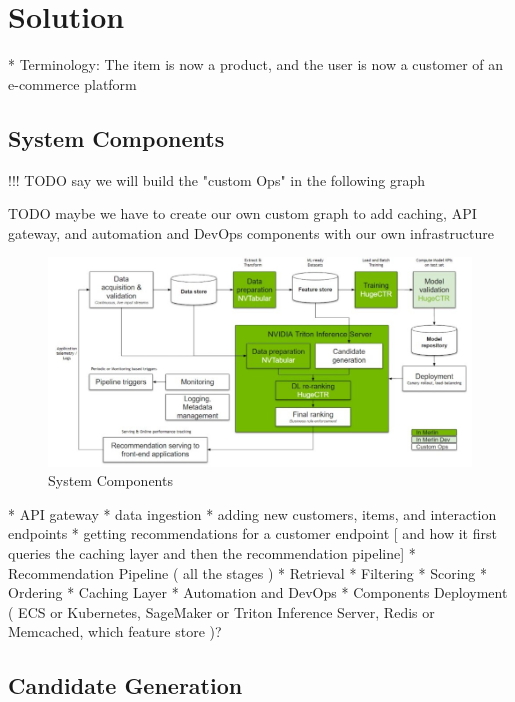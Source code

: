 \chapter{Solution}


* Terminology: The item is now a product, and the user is now a customer of an e-commerce platform

\section{System Components}


!!! TODO say we will build the "custom Ops" in the following graph

TODO maybe we have to create our own custom graph to add caching, API gateway, and automation and DevOps components with our own infrastructure 

\begin{figure}[H]
    \centering
    \includegraphics[width=1\textwidth]{assets/components.jpeg}
    \caption{System Components\cite{NvidiaRecSysBestPractices}}
\end{figure}



* API gateway
    * data ingestion
    * adding new customers, items, and interaction endpoints 
    * getting recommendations for a customer endpoint [ and how it first queries the caching layer and then the recommendation pipeline]
* Recommendation Pipeline ( all the stages )
    * Retrieval
    * Filtering
    * Scoring
    * Ordering
* Caching Layer
* Automation and DevOps
* Components Deployment ( ECS or Kubernetes, SageMaker or Triton Inference Server, Redis or Memcached, which feature store )?



\section{Candidate Generation}





